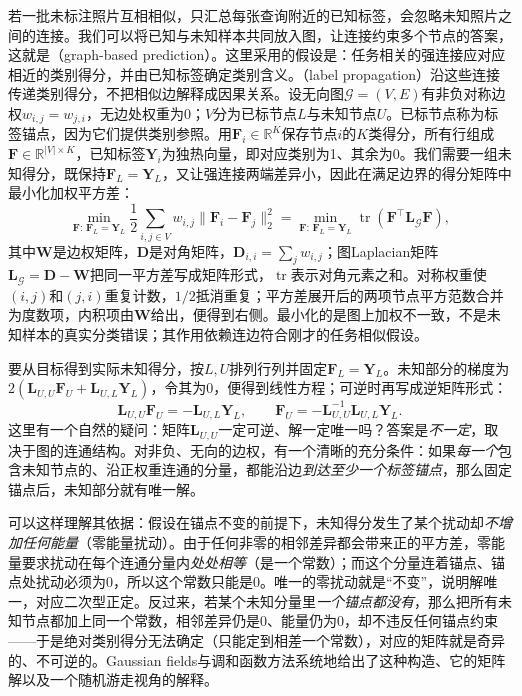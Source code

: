 若一批未标注照片互相相似，只汇总每张查询附近的已知标签，会忽略未知照片之间的连接。我们可以将已知与未知样本共同放入图，让连接约束多个节点的答案，这就是（graph-based prediction）。这里采用的假设是：任务相关的强连接应对应相近的类别得分，并由已知标签确定类别含义。（label propagation）沿这些连接传递类别得分，不把相似边解释成因果关系。设无向图$\mathcal{G}=(V,E)$有非负对称边权$w_{i,j}=w_{j,i}$，无边处权重为0；$V$分为已标节点$L$与未知节点$U$。已标节点称为标签锚点，因为它们提供类别参照。用$\bm{F}_i\in\mathbb{R}^{K}$保存节点$i$的$K$类得分，所有行组成$\bm{F}\in\mathbb{R}^{|V|\times K}$，已知标签$\bm{Y}_i$为独热向量，即对应类别为1、其余为0。我们需要一组未知得分，既保持$\bm{F}_L=\bm{Y}_L$，又让强连接两端差异小，因此在满足边界的得分矩阵中最小化加权平方差：
\begin{equation}
  \min_{\bm{F}:\,\bm{F}_L=\bm{Y}_L}
  \frac{1}{2}\sum_{i,j\in V}w_{i,j}\lVert\bm{F}_i-\bm{F}_j\rVert_2^2
  =
  \min_{\bm{F}:\,\bm{F}_L=\bm{Y}_L}
  \operatorname{tr}\!\left(\bm{F}^{\top}\bm{L}_{\mathcal{G}}\bm{F}\right),
  \label{eq:knowledge-acquisition-graph-energy}
\end{equation}
其中$\bm{W}$是边权矩阵，$\bm{D}$是对角矩阵，$\bm{D}_{i,i}=\sum_jw_{i,j}$；图Laplacian矩阵$\bm{L}_{\mathcal{G}}=\bm{D}-\bm{W}$把同一平方差写成矩阵形式，$\operatorname{tr}$表示对角元素之和。对称权重使$(i,j)$和$(j,i)$重复计数，$1/2$抵消重复；平方差展开后的两项节点平方范数合并为度数项，内积项由$\bm{W}$给出，便得到右侧。最小化的是图上加权不一致，不是未知样本的真实分类错误；其作用依赖连边符合刚才的任务相似假设。

要从目标得到实际未知得分，按$L,U$排列行列并固定$\bm{F}_L=\bm{Y}_L$。未知部分的梯度为$2(\bm{L}_{U,U}\bm{F}_U+\bm{L}_{U,L}\bm{Y}_L)$，令其为0，便得到线性方程；可逆时再写成逆矩阵形式：
\begin{equation}
  \bm{L}_{U,U}\bm{F}_U
  =
  -\bm{L}_{U,L}\bm{Y}_L,
  \qquad
  \bm{F}_U
  =
  -\bm{L}_{U,U}^{-1}\bm{L}_{U,L}\bm{Y}_L.
  \label{eq:knowledge-acquisition-graph-solution}
\end{equation}
这里有一个自然的疑问：矩阵$\bm{L}_{U,U}$一定可逆、解一定唯一吗？答案是\emph{不一定}，取决于图的连通结构。对非负、无向的边权，有一个清晰的充分条件：如果\emph{每一个}包含未知节点的、沿正权重连通的分量，都能沿边\emph{到达至少一个标签锚点}，那么固定锚点后，未知部分就有唯一解。

可以这样理解其依据：假设在锚点不变的前提下，未知得分发生了某个扰动却\emph{不增加任何能量}（零能量扰动）。由于任何非零的相邻差异都会带来正的平方差，零能量要求扰动在每个连通分量内\emph{处处相等}（是一个常数）；而这个分量连着锚点、锚点处扰动必须为0，所以这个常数只能是0。唯一的零扰动就是“不变”，说明解唯一，对应二次型正定。反过来，若某个未知分量里\emph{一个锚点都没有}，那么把所有未知节点都加上同一个常数，相邻差异仍是0、能量仍为0，却不违反任何锚点约束——于是绝对类别得分无法确定（只能定到相差一个常数），对应的矩阵就是奇异的、不可逆的。Gaussian fields与调和函数方法系统地给出了这种构造、它的矩阵解以及一个随机游走视角的解释。

